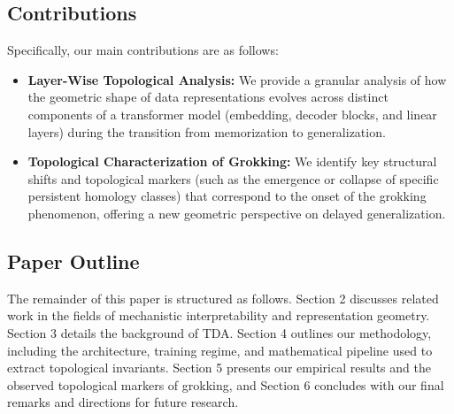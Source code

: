 \subsection{Contributions}

Specifically, our main contributions are as follows:
\begin{itemize}[noitemsep,topsep=0pt]
\item \textbf{Layer-Wise Topological Analysis:} We provide a granular analysis of how the geometric shape of data representations evolves across distinct components of a transformer model (embedding, decoder blocks, and linear layers) during the transition from memorization to generalization.
\item \textbf{Topological Characterization of Grokking:} We identify key structural shifts and topological markers (such as the emergence or collapse of specific persistent homology classes) that correspond to the onset of the grokking phenomenon, offering a new geometric perspective on delayed generalization.
\end{itemize}

\subsection{Paper Outline}
The remainder of this paper is structured as follows. Section 2 discusses related work in the fields of mechanistic interpretability and representation geometry. Section 3 details the background of TDA. Section 4 outlines our methodology, including the architecture, training regime, and mathematical pipeline used to extract topological invariants. Section 5 presents our empirical results and the observed topological markers of grokking, and Section 6 concludes with our final remarks and directions for future research.


